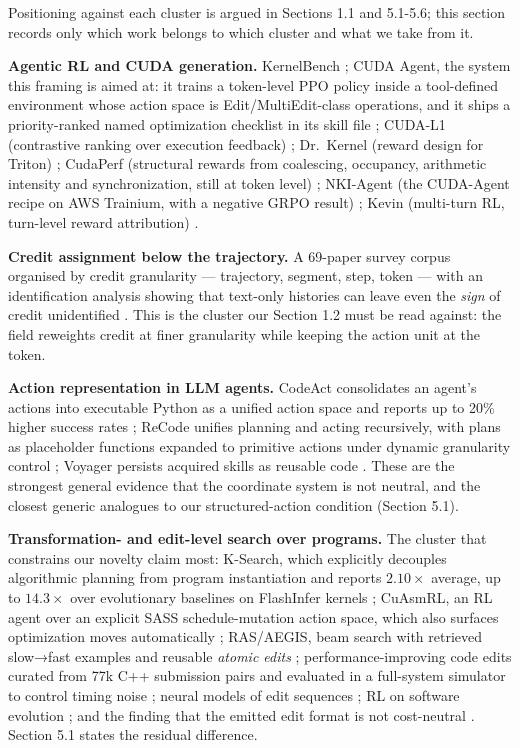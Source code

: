 \documentclass[
  11pt,
]{article}
\begin{document}
Positioning against each cluster is argued in Sections 1.1 and 5.1-5.6; this section records only which work belongs to which cluster and what we take from it.

\textbf{Agentic RL and CUDA generation.} KernelBench \cite{kernelbench2}; CUDA Agent, the system this framing is aimed at: it trains a token-level PPO policy inside a tool-defined environment whose action space is Edit/MultiEdit-class operations, and it ships a priority-ranked named optimization checklist in its skill file \cite{cuda1}; CUDA-L1 (contrastive ranking over execution feedback) \cite{cudal16}; Dr.~Kernel (reward design for Triton) \cite{dr17}; CudaPerf (structural rewards from coalescing, occupancy, arithmetic intensity and synchronization, still at token level) \cite{multiturn15}; NKI-Agent (the CUDA-Agent recipe on AWS Trainium, with a negative GRPO result) \cite{nkiagent18}; Kevin (multi-turn RL, turn-level reward attribution) \cite{kevin32}.

\textbf{Credit assignment below the trajectory.} A 69-paper survey corpus organised by credit granularity --- trajectory, segment, step, token --- with an identification analysis showing that text-only histories can leave even the \emph{sign} of credit unidentified \cite{from35}. This is the cluster our Section 1.2 must be read against: the field reweights credit at finer granularity while keeping the action unit at the token.

\textbf{Action representation in LLM agents.} CodeAct consolidates an agent's actions into executable Python as a unified action space and reports up to 20\% higher success rates \cite{executable33}; ReCode unifies planning and acting recursively, with plans as placeholder functions expanded to primitive actions under dynamic granularity control \cite{recode34}; Voyager persists acquired skills as reusable code \cite{voyager14}. These are the strongest general evidence that the coordinate system is not neutral, and the closest generic analogues to our structured-action condition (Section 5.1).

\textbf{Transformation- and edit-level search over programs.} The cluster that constrains our novelty claim most: K-Search, which explicitly decouples algorithmic planning from program instantiation and reports \(2.10\times\) average, up to \(14.3\times\) over evolutionary baselines on FlashInfer kernels \cite{ksearch29}; CuAsmRL, an RL agent over an explicit SASS schedule-mutation action space, which also surfaces optimization moves automatically \cite{cuasmrl30}; RAS/AEGIS, beam search with retrieved slow→fast examples and reusable \emph{atomic edits} \cite{llm31}; performance-improving code edits curated from 77k C++ submission pairs and evaluated in a full-system simulator to control timing noise \cite{learning4}; neural models of edit sequences \cite{neural5}; RL on software evolution \cite{swerl7}; and the finding that the emitted edit format is not cost-neutral \cite{to6}. Section 5.1 states the residual difference.
\end{document}
